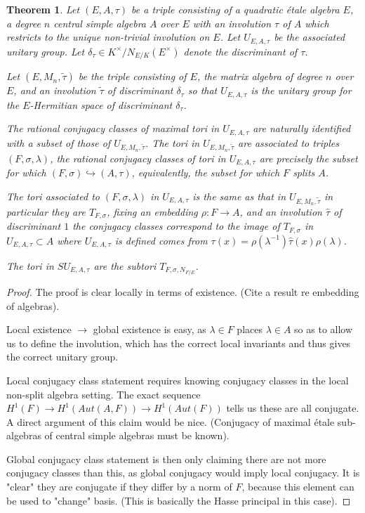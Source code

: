 \documentclass{article}
\theoremstyle{plain}
\newtheorem{theorem}{Theorem}[section]
\theoremstyle{definition}
\numberwithin{equation}{section}
\begin{document}
\begin{theorem}
Let $(E,A,\tau)$ be a triple consisting of a quadratic \'etale algebra $E$, a degree $n$ central simple algebra $A$ over $E$ with an involution $\tau$ of $A$ which restricts to the unique non-trivial involution on $E$. Let $U_{E,A,\tau}$ be the associated unitary group. Let $\delta_{\tau} \in K^\times/N_{E/K}(E^\times)$ denote the discriminant of $\tau$.

Let $(E,M_n,\tilde{\tau})$ be the triple consisting of $E$, the matrix algebra of degree $n$ over $E$, and an involution $\tilde{\tau}$ of discriminant $\delta_{\tau}$ so that $U_{E,A,\tau}$ is the unitary group for the $E$-Hermitian space of discriminant $\delta_{\tau}$.

The rational conjugacy classes of maximal tori in $U_{E,A,\tau}$ are naturally identified with a subset of those of $U_{E,M_n,\tilde{\tau}}$.
The tori in $U_{E,M_n,\tilde{\tau}}$ are associated to triples $(F,\sigma,\lambda)$, the rational conjugacy classes of tori in $U_{E,A,\tau}$ are precisely the subset for which $(F,\sigma)\hookrightarrow (A,\tau)$, equivalently, the subset for which $F$ splits $A$.

The tori associated to $(F,\sigma,\lambda)$ in $U_{E,A,\tau}$ is the same as that in $U_{E,M_n,\tilde{\tau}}$ in particular they are $T_{F,\sigma}$, fixing an embedding $\rho : F \rightarrow A$, and an involution $\hat\tau$ of discriminant $1$ the conjugacy classes correspond to the image of $T_{F,\sigma}$ in $U_{E,A,\tau} \subset A$ where $U_{E,A,\tau}$ is defined comes from $\tau(x) = \rho(\lambda^{-1})\hat\tau(x)\rho(\lambda)$.

The tori in $SU_{E,A,\tau}$ are the subtori $T_{F,\sigma,N_{F/E}}$.
\end{theorem}
\begin{proof}
The proof is clear locally in terms of existence. 
(Cite a result re embedding of algebras).

Local existence $\to$ global existence is easy, as $\lambda \in F$ places $\lambda \in A$ so as to allow us to define the involution, which has the correct local invariants and thus gives the correct unitary group.

Local conjugacy class statement requires knowing conjugacy classes in the local non-split algebra setting. 
The exact sequence $H^1(F) \rightarrow H^1(Aut(A,F)) \rightarrow H^1(Aut(F))$ tells us these are all conjugate.
A direct argument of this claim would be nice.
(Conjugacy of maximal \'etale sub-algebras of central simple algebras must be known).

Global conjugacy class statement is then only claiming there are not more conjugacy classes than this, as global conjugacy would imply local conjugacy.
It is "clear" they are conjugate if they differ by a norm of $F$, because this element can be used to "change" basis.
(This is basically the Hasse principal in this case).
\end{proof}
\end{document}
